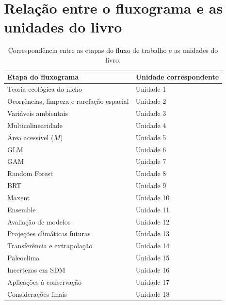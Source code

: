 \section*{Relação entre o fluxograma e as unidades do livro}

\begin{table}[H]
	\centering
	\caption{Correspondência entre as etapas do fluxo de trabalho e as unidades do livro.}
	\begin{tabular}{ll}
		\toprule
		Etapa do fluxograma & Unidade correspondente \\
		\midrule
		Teoria ecológica do nicho & Unidade 1 \\
		Ocorrências, limpeza e rarefação espacial & Unidade 2 \\
		Variáveis ambientais & Unidade 3 \\
		Multicolinearidade & Unidade 4 \\
		Área acessível ($M$) & Unidade 5 \\
		GLM & Unidade 6 \\
		GAM & Unidade 7 \\
		Random Forest & Unidade 8 \\
		BRT & Unidade 9 \\
		Maxent & Unidade 10 \\
		Ensemble & Unidade 11 \\
		Avaliação de modelos & Unidade 12 \\
		Projeções climáticas futuras & Unidade 13 \\
		Transferência e extrapolação & Unidade 14 \\
		Paleoclima & Unidade 15 \\
		Incertezas em SDM & Unidade 16 \\
		Aplicações à conservação & Unidade 17 \\
		Considerações finais & Unidade 18 \\
		\bottomrule
	\end{tabular}
\end{table}

\clearpage
